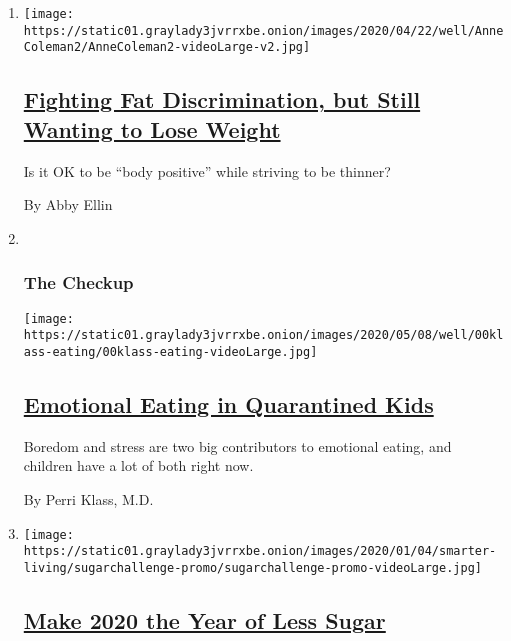\begin{enumerate}
\def\labelenumi{\arabic{enumi}.}
\item
  \texttt{[image: https://static01.graylady3jvrrxbe.onion/images/2020/04/22/well/AnneColeman2/AnneColeman2-videoLarge-v2.jpg]}

  \hypertarget{fighting-fat-discrimination-but-still-wanting-to-lose-weight}{%
  \subsection{\texorpdfstring{\href{/2020/05/07/well/eat/fat-acceptance-weight-loss-body-positive.html}{Fighting
  Fat Discrimination, but Still Wanting to Lose
  Weight}}{Fighting Fat Discrimination, but Still Wanting to Lose Weight}}\label{fighting-fat-discrimination-but-still-wanting-to-lose-weight}}

  Is it OK to be ``body positive'' while striving to be thinner?

  By Abby Ellin
\item ~
  \hypertarget{the-checkup}{%
  \subsubsection{The Checkup}\label{the-checkup}}

  \texttt{[image: https://static01.graylady3jvrrxbe.onion/images/2020/05/08/well/00klass-eating/00klass-eating-videoLarge.jpg]}

  \hypertarget{emotional-eating-in-quarantined-kids}{%
  \subsection{\texorpdfstring{\href{/2020/05/18/well/family/children-emotional-eating-coronavirus.html}{Emotional
  Eating in Quarantined
  Kids}}{Emotional Eating in Quarantined Kids}}\label{emotional-eating-in-quarantined-kids}}

  Boredom and stress are two big contributors to emotional eating, and
  children have a lot of both right now.

  By Perri Klass, M.D.
\item
  \texttt{[image: https://static01.graylady3jvrrxbe.onion/images/2020/01/04/smarter-living/sugarchallenge-promo/sugarchallenge-promo-videoLarge.jpg]}

  \hypertarget{make-2020-the-year-of-less-sugar}{%
  \subsection{\texorpdfstring{\href{/2019/12/30/well/eat/sugar-diet-healthy.html}{Make
  2020 the Year of Less
  Sugar}}{Make 2020 the Year of Less Sugar}}\label{make-2020-the-year-of-less-sugar}}


\end{enumerate}

